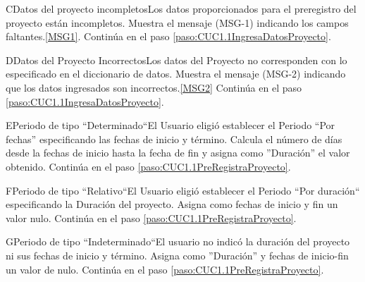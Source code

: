 	\begin{UCtrayectoriaA}{C}{Datos del proyecto incompletos}{Los datos proporcionados para el preregistro del proyecto están incompletos.}
			\UCpaso Muestra el mensaje (MSG-1) indicando los campos faltantes.\ref{MSG1}.
			\UCpaso Continúa en el paso \ref{paso:CUC1.1IngresaDatosProyecto}.
	\end{UCtrayectoriaA}

	\begin{UCtrayectoriaA}{D}{Datos del Proyecto Incorrectos}{Los datos del Proyecto no corresponden con lo especificado en el diccionario de datos.}
			\UCpaso Muestra el mensaje (MSG-2) indicando que los datos ingresados son incorrectos.\ref{MSG2}
			\UCpaso Continúa en el paso \ref{paso:CUC1.1IngresaDatosProyecto}.
	\end{UCtrayectoriaA}


	\begin{UCtrayectoriaA}{E}{Periodo de tipo ``Determinado``}{El Usuario eligió establecer el Periodo ``Por fechas'' especificando las fechas de inicio y término.}
			\UCpaso Calcula el número de días desde la fechas de inicio hasta la fecha de fin y asigna como ''Duración'' el valor obtenido.
			\UCpaso Continúa en el paso \ref{paso:CUC1.1PreRegistraProyecto}.
	\end{UCtrayectoriaA}

	\begin{UCtrayectoriaA}{F}{Periodo de tipo ``Relativo``}{El Usuario eligió establecer el Periodo ``Por duración`` especificando la Duración del proyecto.}
			\UCpaso Asigna como fechas de inicio y fin un valor nulo.
			\UCpaso Continúa en el paso \ref{paso:CUC1.1PreRegistraProyecto}.
	\end{UCtrayectoriaA}

	\begin{UCtrayectoriaA}{G}{Periodo de tipo ``Indeterminado``}{El usuario no indicó la duración del proyecto ni sus fechas de inicio y término.}
			\UCpaso Asigna como ''Duración'' y fechas de inicio-fin un valor de nulo.
			\UCpaso Continúa en el paso \ref{paso:CUC1.1PreRegistraProyecto}.
	\end{UCtrayectoriaA}


